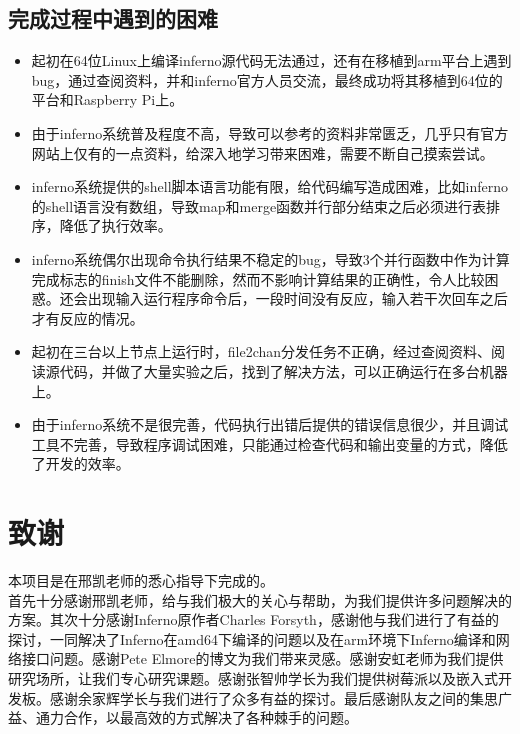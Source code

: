 \documentclass[paper=a4]{ctexart} %
\numberwithin{equation}{section} %
\numberwithin{figure}{section} %
\numberwithin{table}{section} %
\newcommand{\n}{\\\indent}
\begin{document}
\subsection{完成过程中遇到的困难}
\begin{itemize}
\item 起初在64位Linux上编译inferno源代码无法通过，还有在移植到arm平台上遇到bug，通过查阅资料，并和inferno官方人员交流，最终成功将其移植到64位的平台和Raspberry Pi上。
\item 由于inferno系统普及程度不高，导致可以参考的资料非常匮乏，几乎只有官方网站上仅有的一点资料，给深入地学习带来困难，需要不断自己摸索尝试。
\item inferno系统提供的shell脚本语言功能有限，给代码编写造成困难，比如inferno的shell语言没有数组，导致map和merge函数并行部分结束之后必须进行表排序，降低了执行效率。 
\item inferno系统偶尔出现命令执行结果不稳定的bug，导致3个并行函数中作为计算完成标志的finish文件不能删除，然而不影响计算结果的正确性，令人比较困惑。还会出现输入运行程序命令后，一段时间没有反应，输入若干次回车之后才有反应的情况。
\item 起初在三台以上节点上运行时，file2chan分发任务不正确，经过查阅资料、阅读源代码，并做了大量实验之后，找到了解决方法，可以正确运行在多台机器上。
\item 由于inferno系统不是很完善，代码执行出错后提供的错误信息很少，并且调试工具不完善，导致程序调试困难，只能通过检查代码和输出变量的方式，降低了开发的效率。
\end{itemize}


\section{致谢}
本项目是在邢凯老师的悉心指导下完成的。\n
首先十分感谢邢凯老师，给与我们极大的关心与帮助，为我们提供许多问题解决的方案。其次十分感谢Inferno原作者Charles Forsyth，感谢他与我们进行了有益的探讨，一同解决了Inferno在amd64下编译的问题以及在arm环境下Inferno编译和网络接口问题。感谢Pete Elmore的博文为我们带来灵感。感谢安虹老师为我们提供研究场所，让我们专心研究课题。感谢张智帅学长为我们提供树莓派以及嵌入式开发板。感谢余家辉学长与我们进行了众多有益的探讨。最后感谢队友之间的集思广益、通力合作，以最高效的方式解决了各种棘手的问题。
 
\end{document}
